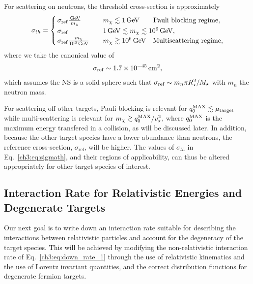For scattering on neutrons, the threshold cross-section is approximately
\begin{align}
\sigma_{th} =  \begin{cases}
\, \sigma_\mathrm{ref} \frac{{\rm \,GeV}}{m_\chi} \quad &m_\chi \lesssim 1{\rm \,GeV} \quad \ \ \text{ Pauli blocking  regime}, \\
\, \sigma_\mathrm{ref} \quad &1{\rm \,GeV} \lesssim m_\chi \lesssim 10^6{\rm \,GeV},  \\
\, \sigma_\mathrm{ref} \frac{m_\chi}{10^6{\rm \,GeV}} \quad &m_\chi\gtrsim 10^6{\rm \,GeV} \quad  \text{Multiscattering regime},
\end{cases}
\label{ch3:eq:sigmath}
\end{align}
where we take the canonical value of
\begin{equation}
    \sigma_\mathrm{ref}\sim 1.7 \times 10^{-45}{\rm \,cm}^2,
\end{equation}
which assumes the NS is a solid sphere such that $\sigma_\mathrm{ref}\sim m_n \pi R_\star^2/M_\star$ with $m_n$ the neutron mass.

For scattering off other targets, Pauli blocking is relevant for $q_0^{\rm MAX} \lesssim  \mu_{\rm target}$ 
while multi-scattering is relevant for $m_\chi \gtrsim q_0^{\rm MAX}/v_{\star}^2$, where $q_0^{\rm MAX}$ is the maximum energy transfered in a collision, as will be discussed later.  In addition, because the other target species have a lower abundance than neutrons, the reference cross-section, $\sigma_\mathrm{ref}$, will be higher. The values of $\sigma_{th}$ in Eq.~\ref{ch3:eq:sigmath}, and their regions of applicability, can thus be altered appropriately for other target species of interest.

\subsection{Interaction Rate for Relativistic Energies and Degenerate Targets}
\label{ch3:subsec:int_rate_degen_rel}

Our next goal is to write down an interaction rate suitable for describing the interactions between relativistic particles and account for the degeneracy of the target species. This will be achieved by modifying the non-relativistic interaction rate of Eq.~\ref{ch3:eq:down_rate_1} through the use of relativistic kinematics and the use of Lorentz invariant quantities, and the correct distribution functions for degenerate fermion targets.

